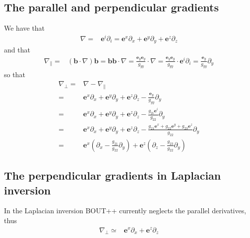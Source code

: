\documentclass[12pt]{article}
\def\L{\left}
\def\R{\right}
\newcommand{\Grad}{\ensuremath{\nabla}}
\newcommand{\ve}[1]{\ensuremath{\boldsymbol{#1}}}
\begin{document}
\subsection{The parallel and perpendicular gradients}
%
We have that
%
\begin{align*}
    \Grad =& \ve{e}^i \partial_i
          = \ve{e}^x \partial_x + \ve{e}^y \partial_y + \ve{e}^z \partial_z
\end{align*}
%
and that
%
\begin{align*}
    \Grad_\| =& \L(\ve{b} \cdot \Grad\R) \ve{b}
             = \ve{b} \ve{b} \cdot \Grad
             = \frac{\ve{e}_y \ve{e}_y}{g_{yy}} \cdot \Grad
             = \frac{\ve{e}_y \ve{e}_y}{g_{yy}} \cdot \ve{e}^i \partial_i
             = \frac{\ve{e}_y}{g_{yy}} \partial_y
\end{align*}
%
so that
%
\begin{align*}
    \Grad_\perp =& \Grad - \Grad_\|\\
%
                =& \ve{e}^x \partial_x + \ve{e}^y \partial_y + \ve{e}^z
                   \partial_z - \frac{\ve{e}_y}{g_{yy}} \partial_y\\
%
                =& \ve{e}^x \partial_x + \ve{e}^y \partial_y + \ve{e}^z
                   \partial_z - \frac{g_{2i}\ve{e}^i}{g_{22}} \partial_y\\
%
                =& \ve{e}^x \partial_x + \ve{e}^y \partial_y + \ve{e}^z
                   \partial_z
                   - \frac{g_{21}\ve{e}^x
                          +g_{22}\ve{e}^y
                          +g_{23}\ve{e}^z
                          }{g_{22}}\partial_y\\
%
                =& \ve{e}^x \L(\partial_x - \frac{g_{21}}{g_{22}}\partial_y\R)
                +  \ve{e}^z \L(\partial_z - \frac{g_{23}}{g_{22}}\partial_y\R)
\end{align*}
%
\subsection{The perpendicular gradients in Laplacian inversion}
In the Laplacian inversion BOUT++ currently neglects the parallel derivatives,
thus
%
\begin{align*}
    \Grad_\perp \simeq&
        \ve{e}^x \partial_x
     +  \ve{e}^z \partial_z
\end{align*}
\end{document}
